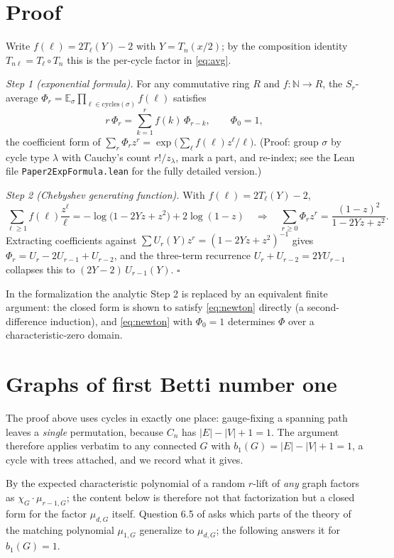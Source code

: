 \documentclass[11pt]{article}
\theoremstyle{remark}
\newcommand{\E}{\mathbb{E}}
\begin{document}
\section{Proof}

Write $f(\ell)=2T_\ell(Y)-2$ with $Y=T_n(x/2)$; by the composition identity
$T_{n\ell}=T_\ell\circ T_n$ this is the per-cycle factor in \eqref{eq:avg}.

\emph{Step 1 (exponential formula).} For any commutative ring $R$ and
$f:\mathbb N\to R$, the $S_r$-average
$\Phi_r=\E_\sigma\prod_{\ell\in\mathrm{cycles}(\sigma)}f(\ell)$ satisfies
\begin{equation}\label{eq:newton}
r\,\Phi_r=\sum_{k=1}^{r}f(k)\,\Phi_{r-k},\qquad\Phi_0=1 ,
\end{equation}
the coefficient form of $\sum_r\Phi_r z^r=\exp\bigl(\sum_\ell f(\ell)z^\ell/\ell\bigr)$.
(Proof: group $\sigma$ by cycle type $\lambda$ with Cauchy's count
$r!/z_\lambda$, mark a part, and re-index; see the Lean file
\texttt{Paper2ExpFormula.lean} for the fully detailed version.)

\emph{Step 2 (Chebyshev generating function).} With $f(\ell)=2T_\ell(Y)-2$,
\[
\sum_{\ell\ge1}f(\ell)\frac{z^\ell}{\ell}
=-\log\bigl(1-2Yz+z^2\bigr)+2\log(1-z)
\quad\Longrightarrow\quad
\sum_{r\ge0}\Phi_r z^r=\frac{(1-z)^2}{1-2Yz+z^2}.
\]
Extracting coefficients against $\sum U_r(Y)z^r=(1-2Yz+z^2)^{-1}$ gives
$\Phi_r=U_r-2U_{r-1}+U_{r-2}$, and the three-term recurrence
$U_r+U_{r-2}=2YU_{r-1}$ collapses this to $(2Y-2)\,U_{r-1}(Y)$.
\hfill$\square$

In the formalization the analytic Step 2 is replaced by an equivalent
finite argument: the closed form is shown to satisfy \eqref{eq:newton}
directly (a second-difference induction), and \eqref{eq:newton} with
$\Phi_0=1$ determines $\Phi$ over a characteristic-zero domain.

\section{Graphs of first Betti number one}\label{sec:uni}

The proof above uses cycles in exactly one place: gauge-fixing a spanning path
leaves a \emph{single} permutation, because $C_n$ has $|E|-|V|+1=1$. The
argument therefore applies verbatim to any connected $G$ with
$b_1(G)=|E|-|V|+1=1$, a cycle with trees attached, and we record what it gives.

By \cite{HPS} the expected characteristic polynomial of a random $r$-lift of
\emph{any} graph factors as $\chi_G\cdot\mu_{r-1,G}$; the content below is
therefore not that factorization but a closed form for the factor
$\mu_{d,G}$ itself. Question 6.5 of \cite{HPS} asks which parts of the theory
of the matching polynomial $\mu_{1,G}$ generalize to $\mu_{d,G}$; the following
answers it for $b_1(G)=1$.
\end{document}
